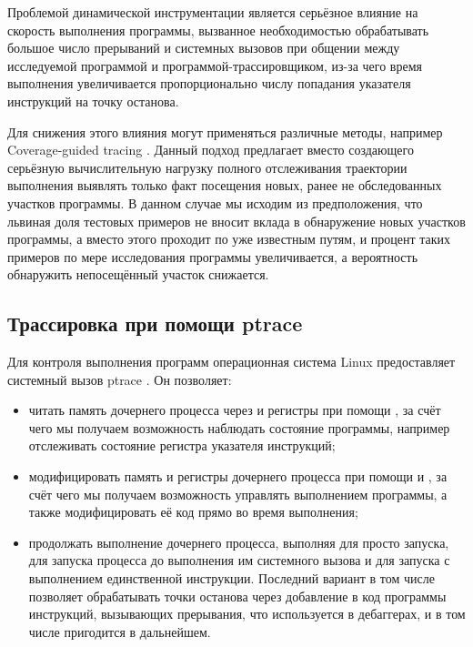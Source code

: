 Проблемой динамической инструментации является серьёзное влияние на скорость выполнения программы, вызванное необходимостью обрабатывать большое число прерываний и системных вызовов при общении между исследуемой программой и программой-трассировщиком, из-за чего время выполнения увеличивается пропорционально числу попадания указателя инструкций на точку останова.

Для снижения этого влияния могут применяться различные методы, например Coverage-guided tracing \cite{full-speed-fuzzing}. Данный подход предлагает вместо создающего серьёзную вычислительную нагрузку полного отслеживания траектории выполнения выявлять только факт посещения новых, ранее не обследованных участков программы. В данном случае мы исходим из предположения, что львиная доля тестовых примеров не вносит вклада в обнаружение новых участков программы, а вместо этого проходит по уже известным путям, и процент таких примеров по мере исследования программы увеличивается, а вероятность обнаружить непосещённый участок снижается.

\subsection{Трассировка при помощи ptrace}

Для контроля выполнения программ операционная система Linux предоставляет системный вызов ptrace \cite{ptrace}. Он позволяет:

\begin{itemize}
	\item читать память дочернего процесса через  и регистры при помощи , за счёт чего мы получаем возможность наблюдать состояние программы, например отслеживать состояние регистра указателя инструкций;
	
	\item модифицировать память и регистры дочернего процесса при помощи  и , за счёт чего мы получаем возможность управлять выполнением программы, а также модифицировать её код прямо во время выполнения;
	
	\item продолжать выполнение дочернего процесса, выполняя  для просто запуска,  для запуска процесса до выполнения им системного вызова и  для запуска с выполнением единственной инструкции. Последний вариант в том числе позволяет обрабатывать точки останова через добавление в код программы инструкций, вызывающих прерывания, что используется в дебаггерах, и в том числе пригодится в дальнейшем.
\end{itemize}

